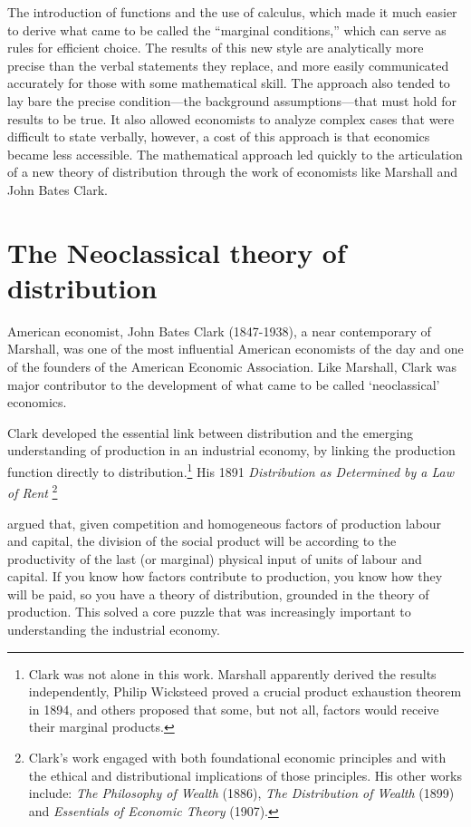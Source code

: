 
 The introduction of functions and the use of calculus, which  made it much easier to  derive what came to be called the ``marginal conditions,'' which can serve as rules for efficient choice. The results of this new style are analytically more precise than the verbal statements they replace, and more easily communicated accurately for those with some mathematical skill. The approach also tended to lay bare the precise condition---the background assumptions---that must hold for results to be true. It also allowed economists to analyze complex cases that were difficult to state verbally, however, a cost of this approach is that economics became less accessible. The mathematical approach led quickly to the articulation of a new theory of distribution through the work of economists like Marshall and John Bates Clark.

\section{The Neoclassical theory of distribution}
American economist, John Bates Clark (1847-1938), a near contemporary of Marshall, was one of the most influential American economists of the day and one of the founders of the American Economic Association.  Like Marshall, Clark was major contributor to the development of what came to be called `neoclassical' economics. 

Clark developed the essential link between distribution and the emerging understanding of production in an industrial economy, by linking the production function directly to distribution.\footnote{Clark was not alone in this work. Marshall apparently derived the results independently, Philip Wicksteed proved a crucial product exhaustion theorem in 1894, and others proposed that some, but not all, factors would receive their marginal products.} His 1891 \textit{Distribution as Determined by a Law of Rent} \cite{clarkDistributionDeterminedLaw1891}\footnote{Clark's work engaged with both foundational economic principles and with the ethical and distributional implications of those principles. His other works include: \textit{The Philosophy of Wealth} (1886), \textit{The Distribution of Wealth} (1899) and \textit{Essentials of Economic Theory} (1907).}

 argued that, given competition and homogeneous factors of production labour and capital, the division of the social product will be according to the productivity of the last (or marginal) physical input of units of labour and capital. If you know how factors contribute to production, you know how they will be paid, so you have a theory of distribution, grounded in the theory of production. This solved a core puzzle that was increasingly important to understanding the industrial economy.

